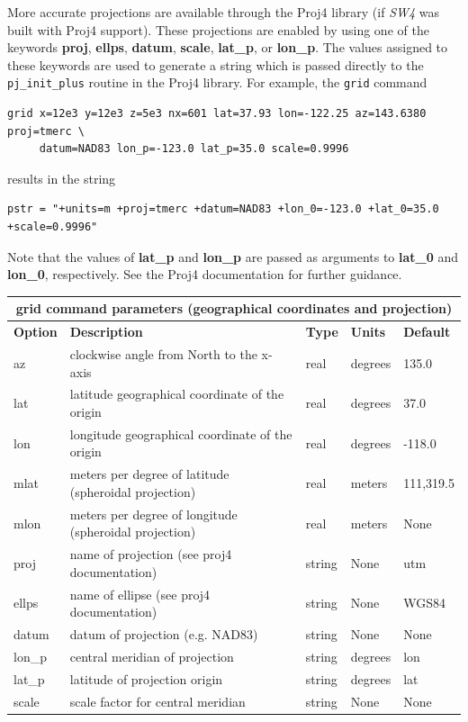 \documentclass[11pt]{report}
\begin{document}
More accurate projections are available through the Proj4 library (if \emph{SW4} was built with
Proj4 support). These projections are enabled by using one of the keywords {\bf proj}, {\bf ellps},
{\bf datum}, {\bf scale}, {\bf lat\_p}, or {\bf lon\_p}. The values assigned to these keywords are
used to generate a string which is passed directly to the {\tt pj\_init\_plus} routine in the Proj4
library. For example, the \verb+grid+ command
\begin{verbatim}
grid x=12e3 y=12e3 z=5e3 nx=601 lat=37.93 lon=-122.25 az=143.6380 proj=tmerc \
     datum=NAD83 lon_p=-123.0 lat_p=35.0 scale=0.9996
\end{verbatim}
results in the string
\begin{verbatim}
pstr = "+units=m +proj=tmerc +datum=NAD83 +lon_0=-123.0 +lat_0=35.0 +scale=0.9996"
\end{verbatim}
Note that the values of {\bf lat\_p} and {\bf lon\_p} are passed as arguments to {\bf lat\_0} and
{\bf lon\_0}, respectively. See the Proj4 documentation for further guidance.
\begin{center}
\begin{tabular}{|l|p{8cm}|l|l|l|} \hline
\multicolumn{5}{|c|}{\bf grid command parameters (geographical coordinates and projection)}\\ \hline
\bf{Option} & \bf{Description} & \bf{Type} & \bf{Units} & \bf{Default}\\ \hline \hline
az & clockwise angle from North to the x-axis & real & degrees & 135.0 \\ \hline
lat & latitude geographical coordinate of the origin & real & degrees & 37.0 \\ \hline
lon & longitude geographical coordinate of the origin & real & degrees & -118.0 \\ \hline
mlat & meters per degree of latitude (spheroidal projection) & real & meters & 111,319.5 \\ \hline
mlon & meters per degree of longitude (spheroidal projection) & real & meters & None \\ \hline
proj & name of  projection (see proj4 documentation) & string & None & utm \\ \hline
ellps & name of ellipse (see proj4 documentation) & string & None & WGS84 \\ \hline
datum & datum of projection (e.g. NAD83) & string & None & None \\ \hline
lon\_p & central meridian of projection & string & degrees & lon \\ \hline
lat\_p & latitude of projection origin & string & degrees & lat \\ \hline
scale & scale factor for central meridian & string & None & None \\ \hline
\end{tabular}
\end{center}
\end{document}

